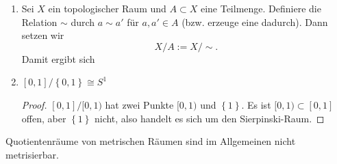 \begin{example}
\begin{enumerate}[1)]
\begin{equation}
            \begin{tikzcd}
                \R^{n+1} \setminus \left \{0\right\}  \ar[two heads]{d} \ar[shift left]{r}{f} & S^n \ar[shift left]{l}{ι} \ar[two heads]{d} \\
                \R P^n \ar[dashed, shift left]{r}{\overline{f}} & S^n / (x \sim  - x) \ar[dashed, shift left]{l}{\overline{ι}}
            \end{tikzcd}
            \end{equation}
            Die Abbildungen $\overline{ι}$ und $\overline{f}$ sind stetig nach der universellen Eigenschaft und invers zueinander. \\
            \begin{minipage}{\textwidth}
                \centering
{}
            \end{minipage}
            \\ 
        \item Sei $X$ ein topologischer Raum und  $A\subset X$ eine Teilmenge. Definiere die Relation $\sim $ durch $a\sim a'$ für $a,a'\in A$ (bzw. erzeuge eine dadurch). Dann setzen wir
            \[
            X / A := X / \sim 
            .\] 
            Damit ergibt sich
                \item $[0,1] / \left \{0,1\right\} \cong S^1$ 
    \begin{proof}
    $[0,1] / [0,1)$ hat zwei Punkte  $[0,1)$ und  $\left \{1\right\} $. Es ist $[0,1) \subset [0,1]$ offen, aber $\left \{1\right\} $ nicht, also handelt es sich um den Sierpinski-Raum.
    \end{proof}
    \end{enumerate}
\end{example}
\begin{remark}
    Quotientenräume von metrischen Räumen sind im Allgemeinen nicht metrisierbar.
\end{remark}




